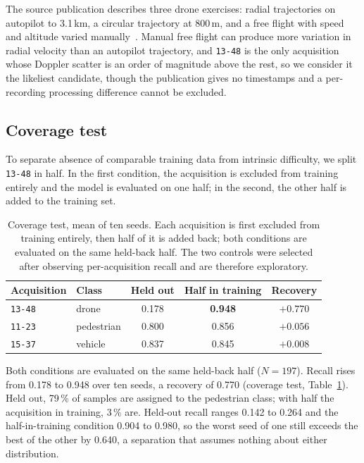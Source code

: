 \documentclass[conference]{IEEEtran}
\begin{document}
The source publication describes three drone exercises: radial trajectories on autopilot to 3.1\,km, a circular trajectory at 800\,m, and a free flight with speed and altitude varied manually~\cite{roldan2020,quevedo2019}. Manual free flight can produce more variation in radial velocity than an autopilot trajectory, and \texttt{13-48} is the only acquisition whose Doppler scatter is an order of magnitude above the rest, so we consider it the likeliest candidate, though the publication gives no timestamps and a per-recording processing difference cannot be excluded.

\subsection{Coverage test}

To separate absence of comparable training data from intrinsic difficulty, we split \texttt{13-48} in half. In the first condition, the acquisition is excluded from training entirely and the model is evaluated on one half; in the second, the other half is added to the training set.


\begin{table}[t]
\caption{Coverage test, mean of ten seeds. Each acquisition is first excluded
from training entirely, then half of it is added back; both conditions are
evaluated on the same held-back half. The two controls were selected after
observing per-acquisition recall and are therefore exploratory.}
\label{tab:coverage}
\centering
\small
\setlength{\tabcolsep}{4pt}
\begin{tabular}{@{}llccc@{}}
\toprule
Acquisition & Class & Held out & Half in training & Recovery \\
\midrule
\texttt{13-48} & drone      & 0.178 & \textbf{0.948} & \textbf{$+0.770$} \\
\texttt{11-23} & pedestrian & 0.800 & 0.856          & $+0.056$ \\
\texttt{15-37} & vehicle    & 0.837 & 0.845          & $+0.008$ \\
\bottomrule
\end{tabular}
\end{table}

Both conditions are evaluated on the same held-back half ($N=197$). Recall rises from 0.178 to 0.948 over ten seeds, a recovery of 0.770 (coverage test, Table~\ref{tab:coverage}). Held out, 79\,\% of samples are assigned to the pedestrian class; with half the acquisition in training, 3\,\% are. Held-out recall ranges 0.142 to 0.264 and the half-in-training condition 0.904 to 0.980, so the worst seed of one still exceeds the best of the other by 0.640, a separation that assumes nothing about either distribution.
\end{document}
